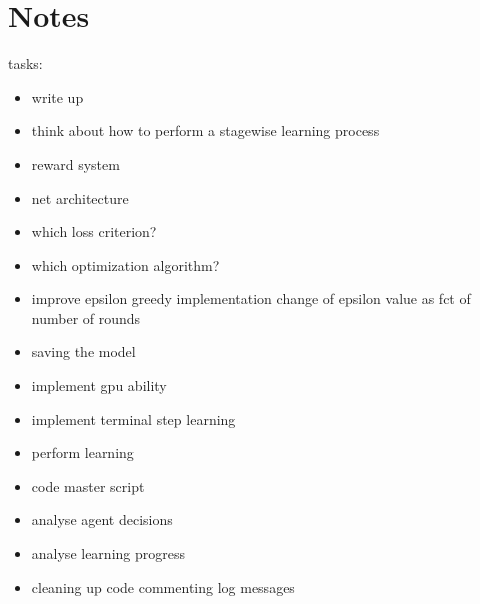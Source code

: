 \section{Notes}

tasks:
\begin{itemize}
\item write up
\item think about how to perform a stagewise learning process
\item reward system
\item net architecture
\item which loss criterion?
\item which optimization algorithm?
\item improve epsilon greedy implementation
\subitem change of epsilon value as fct of number of rounds
\item saving the model
\item implement gpu ability
\item implement terminal step learning
\item perform learning
\item code master script
\item analyse agent decisions
\item analyse learning progress
\item cleaning up code
\subitem commenting
\subitem log messages
\end{itemize}